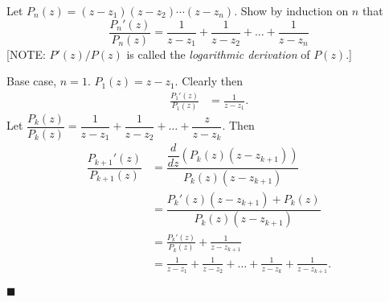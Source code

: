 \documentclass[12pt]{article}
\author{Warren Atkison}
\date{\today}
\renewcommand{\qed}{\hfill$\blacksquare$}
\renewenvironment{proof}{\vspace{1em}\begin{addmargin}[2em]{0em}\begin{newproof}}{\end{newproof}\end{addmargin}\qed}
\newenvironment{exercise}[2][Exercise]{\begin{trivlist}
\item[\hskip \labelsep {\bfseries #1} \hskip \labelsep {\bfseries #2.}]}{\end{trivlist}}
\begin{document}
\fancyhf{}
\fancyhead[R]{\today}
\fancyfoot[R]{\thepage}

\begin{exercise}{2.3.12}
	Let $P_n(z) = (z - z_1)(z - z_2)\cdots(z - z_n)$. Show by induction on $n$ that
	\[
		\frac{P_n'(z)}{P_n(z)} = \frac{1}{z - z_1} + \frac{1}{z - z_2} + \ldots + \frac{1}{z - z_n}
	\]
	[NOTE: $P'(z)/P(z)$ is called the \textit{logarithmic derivation} of $P(z)$.]
\end{exercise}
\begin{proof}
	Base case, $n = 1$. $P_1(z) = z - z_1$. Clearly then
	\begin{align*}
		\frac{P_1'(z)}{P_1(z)} &= \frac{1}{z - z_1}.
	\end{align*}
	Let $\dfrac{P_k(z)}{P_k(z)} = \dfrac{1}{z - z_1} + \dfrac{1}{z - z_2} + \ldots + \dfrac{z}{z - z_k}$. Then
	\begin{align*}
		\dfrac{P_{k+1}'(z)}{P_{k+1}(z)} &= \dfrac{\dfrac{d}{dz}(P_k(z)(z - z_{k+1}))}{P_k(z)(z - z_{k+1})} \\
						&= \dfrac{P_k'(z)(z - z_{k+1}) + P_k(z)}{P_k(z)(z - z_{k+1})} \\
						&= \frac{P_k'(z)}{P_k(z)} + \frac{1}{z - z_{k+1}} \\
						&= \frac{1}{z - z_1} + \frac{1}{z - z_2} + \ldots + \frac{1}{z - z_k} + \frac{1}{z - z_{k+1}}.
	\end{align*}
\end{proof}
\end{document}

